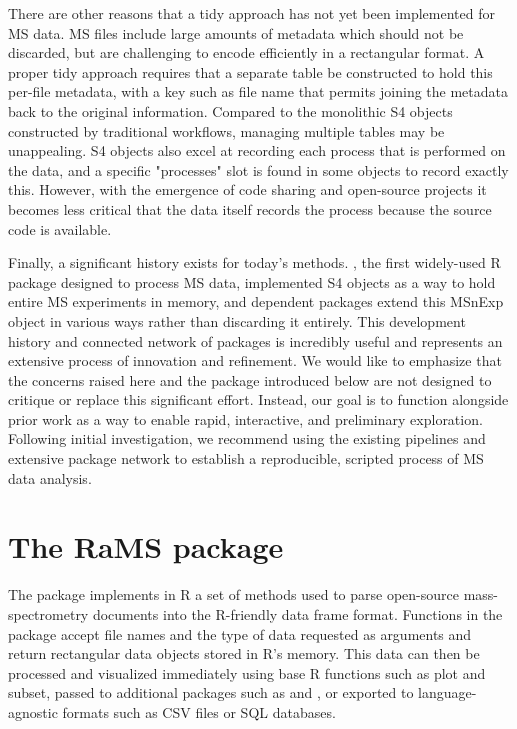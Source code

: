 There are other reasons that a tidy approach has not yet been implemented for MS data. MS files include large amounts of metadata which should not be discarded, but are challenging to encode efficiently in a rectangular format. A proper tidy approach requires that a separate table be constructed to hold this per-file metadata, with a key such as file name that permits joining the metadata back to the original information. Compared to the monolithic S4 objects constructed by traditional workflows, managing multiple tables may be unappealing. S4 objects also excel at recording each process that is performed on the data, and a specific "processes" slot is found in some objects to record exactly this. However, with the emergence of code sharing and open-source projects it becomes less critical that the data itself records the process because the source code is available.

Finally, a significant history exists for today's methods. , the first widely-used R package designed to process MS data, implemented S4 objects as a way to hold entire MS experiments in memory, and dependent packages extend this MSnExp object in various ways rather than discarding it entirely. This development history and connected network of packages is incredibly useful and represents an extensive process of innovation and refinement. We would like to emphasize that the concerns raised here and the package introduced below are not designed to critique or replace this significant effort. Instead, our goal is to function alongside prior work as a way to enable rapid, interactive, and preliminary exploration. Following initial investigation, we recommend using the existing pipelines and extensive package network to establish a reproducible, scripted process of MS data analysis.

\section{The RaMS package}

The  package implements in R a set of methods used to parse open-source mass-spectrometry documents into the R-friendly data frame format. Functions in the package accept file names and the type of data requested as arguments and return rectangular data objects stored in R's memory. This data can then be processed and visualized immediately using base R functions such as plot and subset, passed to additional packages such as  and , or exported to language-agnostic formats such as CSV files or SQL databases.

